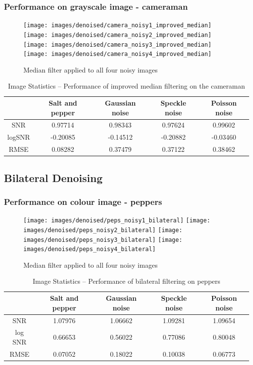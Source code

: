 \documentclass{article}
\begin{document}
\subsubsection{Performance on grayscale image - cameraman}
\begin{figure}[H]
  \centering
  \texttt{[image: images/denoised/camera\_noisy1\_improved\_median]}
  \texttt{[image: images/denoised/camera\_noisy2\_improved\_median]}
  \texttt{[image: images/denoised/camera\_noisy3\_improved\_median]}
  \texttt{[image: images/denoised/camera\_noisy4\_improved\_median]}
  \caption{Median filter applied to all four noisy images }
\end{figure}
\begin{table}[H]
  \centering
  \begin{tabular}{c|c|c|c|c}
    & Salt and pepper & Gaussian noise & Speckle noise & Poisson noise \\
    \hline
    SNR & 0.97714 & 0.98343 & 0.97624 & 0.99602 \\
    logSNR & -0.20085 & -0.14512 & -0.20882 & -0.03460 \\
    RMSE & 0.08282 & 0.37479 & 0.37122 & 0.38462 \\
  \end{tabular}
  \caption{Image Statistics -- Performance of improved median filtering on the cameraman}
\end{table}

% 
\subsection{Bilateral Denoising}
\label{subsec:bilateral-denoise}
\subsubsection{Performance on colour image - peppers}
\begin{figure}[H]
  \centering
  \texttt{[image: images/denoised/peps\_noisy1\_bilateral]}
  \texttt{[image: images/denoised/peps\_noisy2\_bilateral]}
  \texttt{[image: images/denoised/peps\_noisy3\_bilateral]}
  \texttt{[image: images/denoised/peps\_noisy4\_bilateral]}
  \caption{Median filter applied to all four noisy images }
\end{figure}
\begin{table}[H]
  \centering
  \begin{tabular}{c | c | c | c | c}
    & Salt and pepper & Gaussian noise & Speckle noise & Poisson noise \\
    \hline
    SNR & 1.07976 & 1.06662 & 1.09281 & 1.09654 \\
    log SNR & 0.66653 & 0.56022 & 0.77086 & 0.80048 \\
    RMSE & 0.07052 & 0.18022 & 0.10038 & 0.06773 \\
  \end{tabular}
  \caption{Image Statistics -- Performance of bilateral filtering on peppers}
  \label{table:}
\end{table}
%
%
\end{document}
